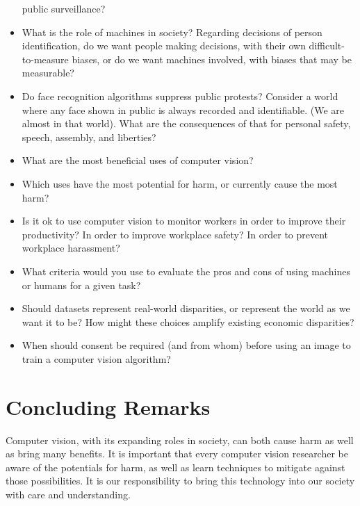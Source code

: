 \begin{itemize}
  public surveillance? 
 \item What is the role of machines in society?  Regarding decisions of person identification,
 do we want people making decisions, with their own difficult-to-measure biases, or do we want machines involved,  with biases that may be measurable? 
\item Do face recognition algorithms suppress public protests?  Consider a world where any face shown in public is always recorded and identifiable.  (We are almost in that world).  What are the consequences of that for personal safety, speech, assembly, and liberties?
\item What are the most beneficial uses of computer vision?
\item Which uses have the most potential for harm, or currently cause the most harm?
\item Is it ok to use computer vision to monitor workers in order to improve their productivity?  In order to improve workplace safety?  In order to prevent workplace harassment? 
\item What criteria would you use to evaluate the pros and cons of using machines or humans for a given task?
\item Should datasets represent real-world disparities, or represent the world as we want it to be?  How might these choices amplify existing economic disparities?
\item When should consent be required (and from whom) before using an image to train a computer vision algorithm?
\end{itemize}

\section{Concluding Remarks}

Computer vision, with its expanding roles in society, can both cause harm as well as bring many benefits.  It is important that every computer vision researcher be aware of the potentials for harm, as well as learn techniques to mitigate against those possibilities.  It is our responsibility to bring this technology into our society with care and understanding.






